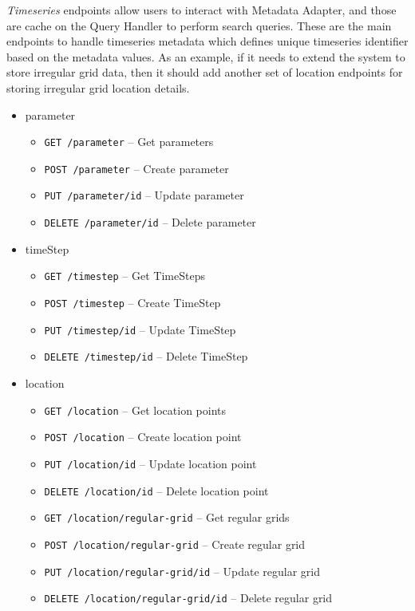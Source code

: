 \emph{Timeseries} endpoints allow users to interact with Metadata Adapter, and those are cache on the Query Handler to perform search queries. These are the main endpoints to handle timeseries metadata which defines unique timeseries identifier based on the metadata values. As an example, if it needs to extend the system to store irregular grid data, then it should add another set of location endpoints for storing irregular grid location details.
\begin{itemize}
    \item parameter
    \begin{itemize}
        \item \texttt{GET /parameter} -- Get parameters
        \item \texttt{POST /parameter} -- Create parameter
        \item \texttt{PUT /parameter/id} -- Update parameter
        \item \texttt{DELETE /parameter/id} -- Delete parameter
    \end{itemize}
    \item timeStep
    \begin{itemize}
        \item \texttt{GET /timestep} -- Get TimeSteps
        \item \texttt{POST /timestep} -- Create TimeStep
        \item \texttt{PUT /timestep/id} -- Update TimeStep
        \item \texttt{DELETE /timestep/id} -- Delete TimeStep
    \end{itemize}
    \item location
    \begin{itemize}
        \item \texttt{GET /location} -- Get location points
        \item \texttt{POST /location} -- Create location point
        \item \texttt{PUT /location/id} -- Update location point
        \item \texttt{DELETE /location/id} -- Delete location point
        \item \texttt{GET /location/regular-grid} -- Get regular grids
        \item \texttt{POST /location/regular-grid} -- Create regular grid
        \item \texttt{PUT /location/regular-grid/id} -- Update regular grid
        \item \texttt{DELETE /location/regular-grid/id} -- Delete regular grid

\end{itemize}
\end{itemize}
